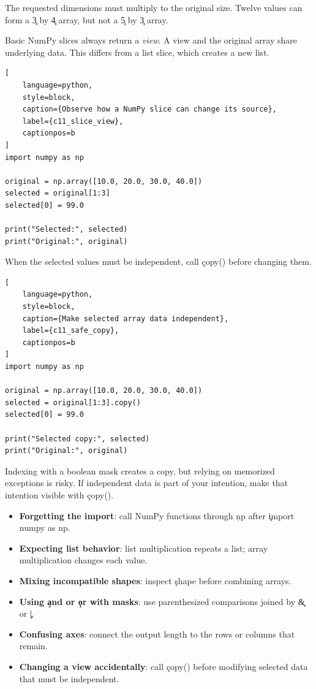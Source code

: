 The requested dimensions must multiply to the original size. Twelve values can
form a \c{3} by \c{4} array, but not a \c{5} by \c{3} array.


Basic NumPy slices always return a \emph{view}. A view and the original array
share underlying data. This differs from a list slice, which creates a new
list.

\begin{lstlisting}[
    language=python,
    style=block,
    caption={Observe how a NumPy slice can change its source},
    label={c11_slice_view},
    captionpos=b
]
import numpy as np

original = np.array([10.0, 20.0, 30.0, 40.0])
selected = original[1:3]
selected[0] = 99.0

print("Selected:", selected)
print("Original:", original)
\end{lstlisting}

When the selected values must be independent, call \c{copy()} before changing
them.

\begin{lstlisting}[
    language=python,
    style=block,
    caption={Make selected array data independent},
    label={c11_safe_copy},
    captionpos=b
]
import numpy as np

original = np.array([10.0, 20.0, 30.0, 40.0])
selected = original[1:3].copy()
selected[0] = 99.0

print("Selected copy:", selected)
print("Original:", original)
\end{lstlisting}

Indexing with a boolean mask creates a copy, but relying on memorized exceptions
is risky. If independent data is part of your intention, make that intention
visible with \c{copy()}.


\begin{itemize}
    \item \textbf{Forgetting the import}: call NumPy functions through \c{np}
    after \c{import numpy as np}.
    \item \textbf{Expecting list behavior}: list multiplication repeats a
    list; array multiplication changes each value.
    \item \textbf{Mixing incompatible shapes}: inspect \c{shape} before
    combining arrays.
    \item \textbf{Using \c{and} or \c{or} with masks}: use parenthesized
    comparisons joined by \c{&} or \c{|}.
    \item \textbf{Confusing axes}: connect the output length to the rows or
    columns that remain.
    \item \textbf{Changing a view accidentally}: call \c{copy()} before
    modifying selected data that must be independent.
\end{itemize}

